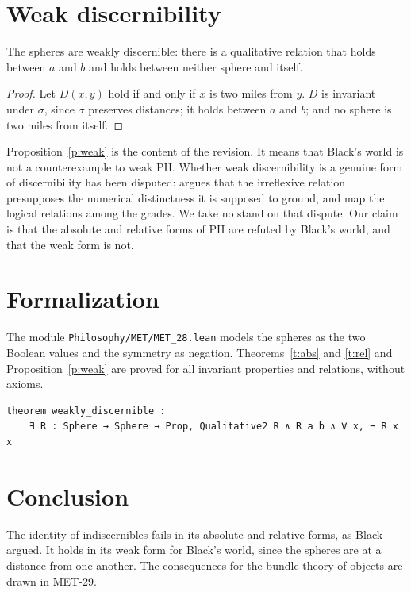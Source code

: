 \documentclass{situationist-preprint}
\begin{document}
\section{Weak discernibility}

\begin{proposition}\label{p:weak}
The spheres are weakly discernible: there is a qualitative relation that holds between $a$ and $b$ and holds between neither sphere and itself.
\end{proposition}

\begin{proof}
Let $D(x,y)$ hold if and only if $x$ is two miles from $y$. $D$ is invariant under $\sigma$, since $\sigma$ preserves distances; it holds between $a$ and $b$; and no sphere is two miles from itself.
\end{proof}

Proposition~\ref{p:weak} is the content of the revision. It means that Black's world is not a counterexample to weak PII. Whether weak discernibility is a genuine form of discernibility has been disputed: \citet{Hawley2009} argues that the irreflexive relation presupposes the numerical distinctness it is supposed to ground, and \citet{LadymanLinneboPettigrew2012} map the logical relations among the grades. We take no stand on that dispute. Our claim is that the absolute and relative forms of PII are refuted by Black's world, and that the weak form is not.

\section{Formalization}

The module \nolinkurl{Philosophy/MET/MET_28.lean} models the spheres as the two Boolean values and the symmetry as negation. Theorems~\ref{t:abs} and \ref{t:rel} and Proposition~\ref{p:weak} are proved for all invariant properties and relations, without axioms.

\begin{lstlisting}
theorem weakly_discernible :
    ∃ R : Sphere → Sphere → Prop, Qualitative2 R ∧ R a b ∧ ∀ x, ¬ R x x
\end{lstlisting}

\section{Conclusion}

The identity of indiscernibles fails in its absolute and relative forms, as Black argued. It holds in its weak form for Black's world, since the spheres are at a distance from one another. The consequences for the bundle theory of objects are drawn in MET-29.
\end{document}
